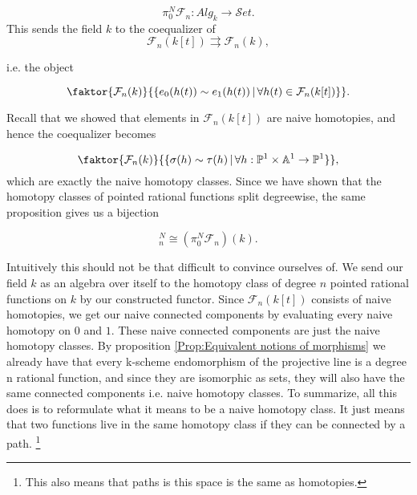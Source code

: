 \begin{equation*}
    \pi_0^N\mathcal{F}_n : Alg_k \longrightarrow \mathcal{S}et .
\end{equation*}
This sends the field \(k\) to the coequalizer of  
\begin{equation*}
    \mathcal{F}_n(k[t])\rightrightarrows \mathcal{F}_n(k), 
\end{equation*}

i.e. the object 

\begin{equation*}
    \faktor{\mathcal{F}_n(k)}{\{ e_0(h(t)) \sim e_1(h(t)) \, | \, \forall h(t) \in \mathcal{F}_n(k[t])\}}. 
\end{equation*}

Recall that we showed that elements in \(\mathcal{F}_n(k[t])\) are naive homotopies, and hence the coequalizer becomes 

\begin{equation*}
     \faktor{\mathcal{F}_n(k)}{\{ \sigma(h) \sim \tau(h) \, | \, \forall h : \mathbb{P}^1 \times \mathbb{A}^1 \to \mathbb{P}^1\}}, 
\end{equation*}
which are exactly the naive homotopy classes. 
Since we have shown that the homotopy classes of pointed rational functions split degreewise, the same proposition gives us a bijection
\begin{corollary}\label{cor:connected components is homotopy classes}
\begin{equation*}
    [\mathbb{P}^1, \mathbb{P}^1]_n^N \cong (\pi_0^N\mathcal{F}_n)(k).
\end{equation*}
\end{corollary}

%
Intuitively this should not be that difficult to convince ourselves of. We send our field \(k\) as an algebra over itself to the  homotopy class of degree \(n\) pointed rational functions on \(k\) by our constructed functor. Since \(\mathcal{F}_n(k[t])\) consists of naive homotopies, we get our naive connected components by evaluating every naive homotopy on \(0\) and \(1\). These naive connected components are just the naive homotopy classes. By proposition \ref{Prop:Equivalent notions of morphisms} we already have that every k-scheme endomorphism of the projective line is a degree n rational function, and since they are isomorphic as sets, they will also have the same connected components i.e. naive homotopy classes. To summarize, all this does is to reformulate what it means to be a naive homotopy class. It just means that two functions live in the same homotopy class if they can be connected by a path. \footnote{This also means that paths is this space is the same as homotopies.} 

%